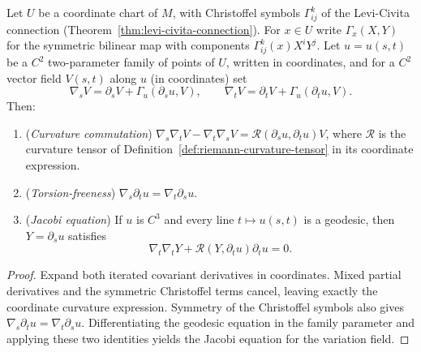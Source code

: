 \begin{lemma}
\label{lem:covariant-commutation-jacobi}
\leanok



Let $U$ be a coordinate chart of $M$, with Christoffel symbols
$\Gamma^k_{ij}$ of the Levi-Civita connection
(Theorem~\ref{thm:levi-civita-connection}). For $x\in U$ write
$\Gamma_x(X,Y)$ for the symmetric bilinear map with components
$\Gamma^k_{ij}(x)X^iY^j$. Let $u=u(s,t)$ be a $C^2$ two-parameter
family of points of $U$, written in coordinates, and for a $C^2$
vector field $V(s,t)$ along $u$ (in coordinates) set
$$\nabla_sV=\partial_sV+\Gamma_u(\partial_su,V),\qquad
\nabla_tV=\partial_tV+\Gamma_u(\partial_tu,V).$$
Then:
\begin{enumerate}
\item ({\em Curvature commutation})
$\nabla_s\nabla_tV-\nabla_t\nabla_sV
={\mathcal R}(\partial_su,\partial_tu)V$, where ${\mathcal R}$ is
the curvature tensor of
Definition~\ref{def:riemann-curvature-tensor} in its coordinate
expression.
\item ({\em Torsion-freeness})
$\nabla_s\partial_tu=\nabla_t\partial_su$.
\item ({\em Jacobi equation}) If $u$ is $C^3$ and every line
$t\mapsto u(s,t)$ is a geodesic, then $Y=\partial_su$ satisfies
$$\nabla_t\nabla_tY+{\mathcal R}(Y,\partial_tu)\partial_tu=0.$$
\end{enumerate}
\end{lemma}

\begin{proof}
\sketch
\leanok
{}
Expand both iterated covariant derivatives in coordinates. Mixed partial derivatives and the symmetric Christoffel terms cancel, leaving exactly the coordinate curvature expression. Symmetry of the Christoffel symbols also gives $\nabla_s\partial_tu=\nabla_t\partial_su$. Differentiating the geodesic equation in the family parameter and applying these two identities yields the Jacobi equation for the variation field.
\end{proof}

